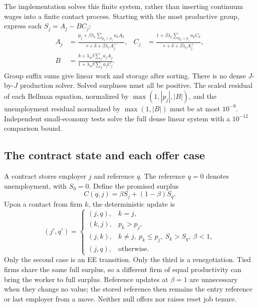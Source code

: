 \documentclass[11pt,letterpaper]{article}
\begin{document}
The implementation solves this finite system, rather than inserting
continuum wages into a finite contact process. Starting with the most
productive group, express each $S_j=A_j-B C_j$:
\begin{align}
 A_j&=\frac{p_j+\beta\lambda_e\sum_{p_k>p_j}a_kA_k}
 {r+\delta+\beta\lambda_e A_j^+},&
 C_j&=\frac{1+\beta\lambda_e\sum_{p_k>p_j}a_kC_k}
 {r+\delta+\beta\lambda_e A_j^+},\\
 B&=\frac{b+\lambda_u\beta\sum_j a_j A_j}
 {1+\lambda_u\beta\sum_j a_j C_j}.\label{eq:cpvsolve}
\end{align}
Group suffix sums give linear work and storage after sorting. There is
no dense $J$-by-$J$ production solver. Solved surpluses must all be
positive. The scaled residual of each Bellman equation, normalized by
$\max(1,|p_j|,|B|)$, and the unemployment residual normalized by
$\max(1,|B|)$ must be at most $10^{-9}$. Independent small-economy tests
solve the full dense linear system with a $10^{-12}$ comparison bound.

\subsection{The contract state and each offer case}
A contract stores employer $j$ and reference $q$. The reference $q=0$
denotes unemployment, with $S_0=0$. Define the promised surplus
\begin{equation}\label{eq:cpvcontract}
 C(q,j)=\beta S_j+(1-\beta)S_q.
\end{equation}
Upon a contact from firm $k$, the deterministic update is
\begin{equation}
 (j',q')=\begin{cases}
 (j,q),&k=j,\\
 (k,j),&p_k>p_j,\\
 (j,k),&k\ne j,\ p_k\le p_j,\ S_k>S_q,\ \beta<1,\\
 (j,q),&\text{otherwise}.
 \end{cases}
\end{equation}
Only the second case is an EE transition. Only the third is a
renegotiation. Tied firms share the same full surplus, so a different
firm of equal productivity can bring the worker to full surplus.
Reference updates at $\beta=1$ are unnecessary when they change no
value; the stored reference then remains the entry reference or last
employer from a move. Neither null offers nor raises reset job tenure.
\end{document}
